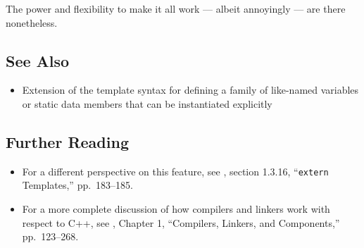 \noindent The power and flexibility to make it all work --- albeit annoyingly ---
are there nonetheless.

\subsection[See Also]{See Also}\label{see-also}

\begin{itemize}
\item{Extension of the template syntax for defining a family of like-named variables or static data members that can be instantiated explicitly}
\end{itemize}

\subsection[Further Reading]{Further Reading}\label{further-reading}

\begin{itemize}
\item{For a different perspective on this feature, see \cite{lakos20},
section 1.3.16, ``\texttt{extern} Templates,'' pp.~183--185.}
\item{For a more complete discussion of how compilers and linkers work with
respect to C++, see \cite{lakos20}, Chapter 1, ``Compilers, Linkers, and
Components,'' pp.~123--268.}
\end{itemize}

